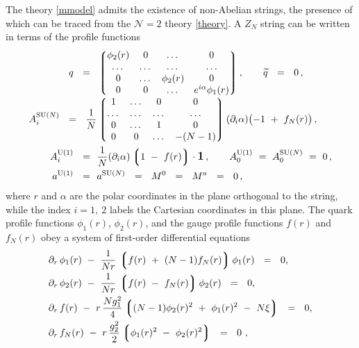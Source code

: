 \documentclass[12pt]{article}
\newcommand{\ntwo}{${\mathcal N}=2$ }
\newcommand{\p}{\partial}
\newcommand{\wt}{\widetilde}
\newcommand{\lgr}{\left\lgroup}
\newcommand{\rgr}{\right\rgroup}
\newcommand{\aU}{a^{\rm U(1)}}
\newcommand{\aN}{a^\text{SU($N$)}}
\begin{document}
	The theory \eqref{mmodel} admits the existence of non-Abelian strings, the presence of which can be traced
	from the \ntwo theory \eqref{theory}.
	A $ Z_N $ string can be written in terms of the profile functions \cite{ABEKY,GSYmmodel}
\begin{align}
%
\notag
	q   ~~=~~  &
		\lgr \begin{matrix}
			\phi_2(r) & 0     & \dots      & 0      \\
			\dots     & \dots & \dots      & \dots  \\
			0         & \dots & \phi_2(r)  & 0      \\
			0         &  0    & \dots      & e^{i\alpha}\phi_1(r) 
		     \end{matrix} \rgr ,
		\qquad \wt{q} ~~=~~ 0\,,
	\\
%
\label{znstr}
	\\[-0.7cm]
%
\notag
	A_i^\text{SU($N$)}  ~~=~~
		\frac{1}{N} & \lgr \begin{matrix}
        			    	1       &   \dots   &  0       &   0   \\
        				\dots   &   \dots   &  \dots   & \dots \\
        				0       &   \dots   &  1       &   0   \\
        				0       &     0     &  \dots   & - (N-1) 
	   		         \end{matrix} \rgr
		(\p_i\alpha)\bigl( -1 ~+~ f_{N}(r) \bigr)\,,
	\\
%
\notag
	A_i^{\rm U(1)}  ~~=~~ & \frac{1}{N}(\p_i\alpha)\lgr 1 ~-~ f(r) \rgr \cdot \mathlarger{\mathbf{1}}\,,
	\qquad 
	A_0^{\rm U(1)} ~=~ A_0^\text{SU($N$)} ~=~ 0\,,
	\\
%
\notag
	\aU ~~=~~ & \aN ~~=~~ M^0 ~~=~~ M^a ~~=~~ 0\,,
\end{align}
	where $ r $ and $ \alpha $ are the polar coordinates in the plane orthogonal to the string, while 
the	index $ i = 1,~ 2 $ labels the Cartesian coordinates in this plane.
	The quark profile functions $ \phi_1(r) $, $ \phi_2(r) $, and the gauge profile functions 
	$ f(r) $ and $ f_N(r) $ obey a system of first-order differential equations
\begin{align}
%
\notag
&	\p_r\, \phi_1(r) ~-~ \frac{1}{Nr}\, \lgr f(r) ~+~ (N-1)f_{N}(r) \rgr \phi_1(r) ~~=~~ 0, \\
%
\notag
&	\p_r\, \phi_2(r) ~-~ \frac{1}{Nr}\, \lgr f(r) ~-~ f_{N}(r) \rgr \phi_2(r) ~~=~~ 0 ,\\
%
\label{foes}
&	\p_r\, f(r) ~-~ r\, \frac{N g_1^2}{4} \lgr (N-1)\phi_2(r)^2 ~+~ \phi_1(r)^2 ~-~ N\xi \rgr ~~=~~ 0 , \\
%
\notag
&	\p_r\, f_{N}(r)  ~-~  r\, \frac{g_2^2}{2} \lgr \phi_1(r)^2 ~-~ \phi_2(r)^2 \rgr ~~=~~ 0~,
\end{align}
\end{document}
